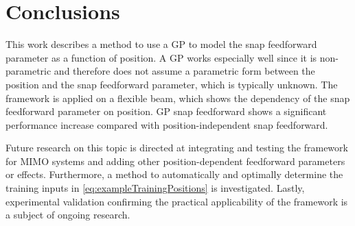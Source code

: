 \documentclass[letterpaper, 10 pt, conference]{ieeeconf}  %
\newcounter{example}
\begin{document}
\section{Conclusions}
\label{sec:conclusions}
This work describes a method to use a GP to model the snap feedforward parameter as a function of position. A GP works especially well since it is non-parametric and therefore does not assume a parametric form between the position and the snap feedforward parameter, which is typically unknown. The framework is applied on a flexible beam, which shows the dependency of the snap feedforward parameter on position. GP snap feedforward shows a significant performance increase compared with position-independent snap feedforward. \par
Future research on this topic is directed at integrating and testing the framework for MIMO systems and adding other position-dependent feedforward parameters or effects. Furthermore, a method to automatically and optimally determine the training inputs in \eqref{eq:exampleTrainingPositions} is investigated. Lastly, experimental validation confirming the practical applicability of the framework is a subject of ongoing research.




\end{document}
